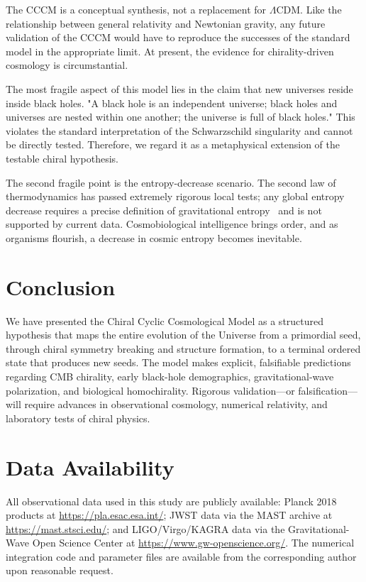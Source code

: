 \documentclass[a4paper,11pt]{article}
\newcommand{\LCDM}{$\Lambda$CDM}
\newcommand{\CCCM}{CCCM}
\begin{document}
The \CCCM{} is a conceptual synthesis, not a replacement for \LCDM. Like the relationship between general relativity and Newtonian gravity, any future validation of the \CCCM{} would have to reproduce the successes of the standard model in the appropriate limit. At present, the evidence for chirality-driven cosmology is circumstantial.

The most fragile aspect of this model lies in the claim that new universes reside inside black holes. "A black hole is an independent universe; black holes and universes are nested within one another; the universe is full of black holes." This violates the standard interpretation of the Schwarzschild singularity and cannot be directly tested. Therefore, we regard it as a metaphysical extension of the testable chiral hypothesis.

The second fragile point is the entropy-decrease scenario. The second law of thermodynamics has passed extremely rigorous local tests; any global entropy decrease requires a precise definition of gravitational entropy~\cite{Clifton2013} and is not supported by current data. Cosmobiological intelligence brings order, and as organisms flourish, a decrease in cosmic entropy becomes inevitable.


\section{Conclusion}
\label{sec:conclusion}

We have presented the Chiral Cyclic Cosmological Model as a structured hypothesis that maps the entire evolution of the Universe from a primordial seed, through chiral symmetry breaking and structure formation, to a terminal ordered state that produces new seeds. The model makes explicit, falsifiable predictions regarding CMB chirality, early black-hole demographics, gravitational-wave polarization, and biological homochirality. Rigorous validation---or falsification---will require advances in observational cosmology, numerical relativity, and laboratory tests of chiral physics.

\section*{Data Availability}

All observational data used in this study are publicly available: Planck 2018 products at \url{https://pla.esac.esa.int/}; JWST data via the MAST archive at \url{https://mast.stsci.edu/}; and LIGO/Virgo/KAGRA data via the Gravitational-Wave Open Science Center at \url{https://www.gw-openscience.org/}. The numerical integration code and parameter files are available from the corresponding author upon reasonable request.
\end{document}
